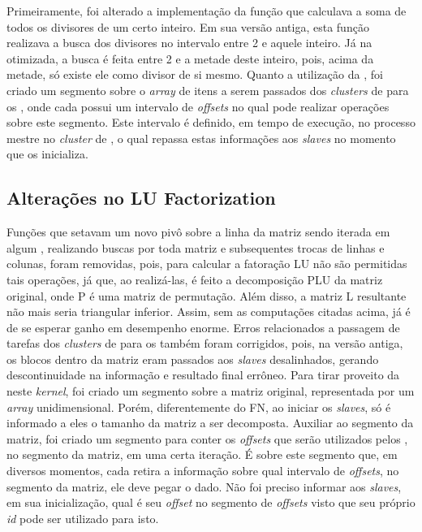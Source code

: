 \documentclass[a4paper,11pt]{article}
\begin{document}
Primeiramente, foi alterado a implementação da função que calculava a soma de todos os divisores de um certo inteiro. Em sua versão antiga, esta função realizava a busca dos divisores no intervalo entre 2 e aquele inteiro. Já na otimizada, a busca é feita entre 2 e a metade deste inteiro, pois, acima da metade, só existe ele como divisor de si mesmo. Quanto a utilização da \async, foi criado um segmento sobre o \textit{array} de itens a serem passados dos \textit{clusters} de \io para os \ccs, onde cada \cc possui um intervalo de \textit{offsets} no qual pode realizar operações sobre este segmento. Este intervalo é definido, em tempo de execução, no processo mestre no \textit{cluster} de \io, o qual repassa estas informações aos \textit{slaves} no momento que os inicializa.

\subsection{Alterações no LU Factorization}

Funções que setavam um novo pivô sobre a linha da matriz sendo iterada em algum \cc , realizando buscas por toda matriz e subsequentes trocas de linhas e colunas, foram removidas, pois, para calcular a fatoração LU não são permitidas tais operações, já que, ao realizá-las, é feito a decomposição PLU da matriz original, onde P é uma matriz de permutação. Além disso, a matriz L resultante não mais seria triangular inferior. Assim, sem as computações citadas acima, já é de se esperar ganho em desempenho enorme. Erros relacionados a passagem de tarefas dos \textit{clusters} de \io para os \ccs também foram corrigidos, pois, na versão antiga, os blocos dentro da matriz eram passados aos \textit{slaves} desalinhados, gerando descontinuidade na informação e resultado final errôneo. Para tirar proveito da \async neste \textit{kernel}, foi criado um segmento sobre a matriz original, representada por um \textit{array} unidimensional. Porém, diferentemente do FN, ao iniciar os \textit{slaves}, só é informado a eles o tamanho da matriz a ser decomposta. Auxiliar ao segmento da matriz, foi criado um segmento para conter os \textit{offsets} que serão utilizados pelos \ccs, no segmento da matriz, em uma certa iteração. É sobre este segmento que, em diversos momentos, cada \cc retira a informação sobre qual intervalo de \textit{offsets}, no segmento da matriz, ele deve pegar o dado. Não foi preciso informar aos \textit{slaves}, em sua inicialização, qual é seu \textit{offset} no segmento de \textit{offsets} visto que seu próprio \textit{id} pode ser utilizado para isto.
\end{document}
